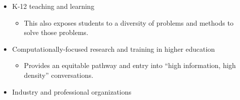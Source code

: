 \documentclass[
  letterpaper,
  DIV=11,
  numbers=noendperiod]{scrartcl}
\providecommand{\tightlist}{%
  \setlength{\itemsep}{0pt}\setlength{\parskip}{0pt}}\usepackage{longtable,booktabs,array}
\begin{document}
\begin{itemize}
\item
  K-12 teaching and learning

  \begin{itemize}
  \tightlist
  \item
    This also exposes students to a diversity of problems and methods to
    solve those problems.
  \end{itemize}
\item
  Computationally-focused research and training in higher education

  \begin{itemize}
  \tightlist
  \item
    Provides an equitable pathway and entry into ``high information,
    high density'' conversations.
  \end{itemize}
\item
  Industry and professional organizations
\end{itemize}
\end{document}
